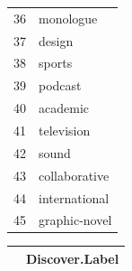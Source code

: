 \documentclass[12pt]{report}   %
\begin{document}
\begin{figure}[h]
\begin{minipage}[h]{0.24\textwidth}
\begin{tabular}{rl}
  36 & monologue \\ 
  37 & design \\ 
  38 & sports \\ 
  39 & podcast \\ 
  40 & academic \\ 
  41 & television \\ 
  42 & sound \\ 
  43 & collaborative \\ 
  44 & international \\ 
    45 & graphic-novel \\ 
  \hline
\end{tabular}
    \end{minipage}
\begin{minipage}[h]{0.24\textwidth}

\begin{tabular}{rl}
  \hline
 & Discover.Label \\ 
  \hline


\end{tabular}
\end{minipage}
\end{figure}
\end{document}
